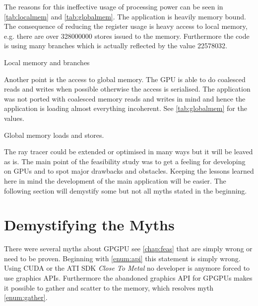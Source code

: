 The reasons for this ineffective usage of processing power can be seen in
\autoref{tab:localmem} and \autoref{tab:globalmem}. The application is heavily
memory bound. The consequence of reducing the register usage is heavy access to
local memory, e.g. there are over 328000000 stores issued to the memory.
Furthermore the code is using many branches which is actually reflected by the
value 22578032.


\begin{table}[ht]
	\centering
	\qquad
	
	\caption{Local memory and branches}
\end{table}

Another point is the access to global memory. The \gls{GPU} is able to do
coalesced reads and writes when possible otherwise the access is serialised. The
application was not ported with coalesced memory reads and writes in mind and
hence the application is loading almost everything incoherent. See
\autoref{tab:globalmem} for the values.

\begin{table}[ht]
    \centering
  	\caption[Global memory loads and stores]{Global memory loads and stores.}
  	\label{tab:globalmem}
\end{table}

The ray tracer could be extended or optimised in many ways but it will be leaved
as is. The main point of the feasibility study was to get a feeling for
developing on \glspl{GPU} and to spot major drawbacks and obstacles. Keeping the
lessons learned here in mind the development of the main application will be
easier. The following section will demystify some but not all myths stated in
the beginning.

\section{Demystifying the Myths} %
\label{sec:demystifing_the_myths}
There were several myths about \gls{GPGPU} see \autoref{chap:feas} that are
simply wrong or need to be proven. Beginning with \autoref{enum:api} this
statement is simply wrong. Using \gls{CUDA} or the ATI \gls{SDK} \emph{Close To
Metal} no developer is anymore forced to use graphics \glspl{API}. Furthermore
the abandoned graphics \gls{API} for \glspl{GPGPU} makes it possible to gather
and scatter to the memory, which resolves myth \autoref{enum:gather}.

